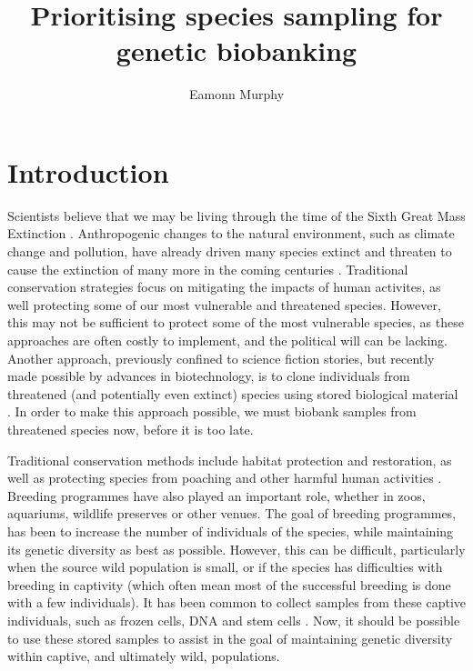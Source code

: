 \documentclass[10pt]{article}
\title{Prioritising species sampling for genetic biobanking}
\author{Eamonn Murphy}
\begin{document}
	\maketitle
	
	\pagebreak
	
	\section{Introduction}

	Scientists believe that we may be living through the time of the Sixth 
	Great Mass Extinction \cite{barnoskyHasEarthSixth2011}. Anthropogenic changes to the natural environment, such 
	as climate change and pollution, have already driven many species extinct and 
	threaten to cause the extinction of many more in the coming centuries \cite{ceballosVertebratesBrinkIndicators2020}. 
	Traditional conservation strategies focus on mitigating the impacts of human
	activites, as well protecting some of our most vulnerable and 
	threatened species. However, this may not be sufficient to protect some of the most
	vulnerable species, as these approaches are often costly to implement, and 
	the political will can be lacking. Another approach, previously confined to
	science fiction stories, but recently made possible by advances in 
	biotechnology, is to clone individuals from threatened (and potentially even
	extinct) species using stored biological material \cite{loiGeneticRescueEndangered2001}. In order to make this approach possible, we must biobank samples from threatened species now, before it is too
	late.
	
	Traditional conservation methods include habitat
	protection and restoration, as well as protecting species from poaching and other
	harmful human activities \cite{mccarthyFinancialCostsMeeting2012}. Breeding programmes have also played an important role,
	whether in zoos, aquariums, wildlife preserves or other venues. The goal of breeding
	programmes, has been to increase the number of individuals of the species, while
	maintaining its genetic diversity as best as possible. However, this can be 
	difficult, particularly when the source wild population is small, or if the species has
	difficulties with breeding in captivity (which often mean most of the successful
	breeding is done with a few individuals). It has been common to collect samples
	from these captive individuals, such as frozen cells, DNA and stem cells \cite{angelesChallengesDevelopmentBiodiversity2022, breithoffArkBankExtinction2020}. Now, it
	should be possible to use these stored samples to assist in the goal of maintaining
	genetic diversity within captive, and ultimately wild, populations.
	
\end{document}
